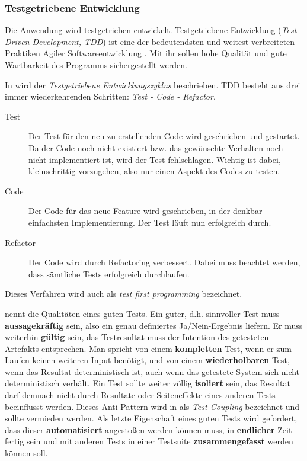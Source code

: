 \subsubsection{Testgetriebene Entwicklung}
\label{subsec:tdd}

Die Anwendung wird testgetrieben entwickelt. Testgetriebene Entwicklung (\textit{Test Driven Development, TDD}) ist eine der bedeutendsten und weitest verbreiteten Praktiken Agiler Softwareentwicklung . Mit ihr sollen hohe Qualität und gute Wartbarkeit des Programms sichergestellt werden.

In  wird der \textit{Testgetriebene Entwicklungszyklus} beschrieben. TDD besteht aus drei immer wiederkehrenden Schritten: \textit{Test - Code - Refactor}.

\begin{description}
  \item[Test] Der Test für den neu zu erstellenden Code wird geschrieben und gestartet. Da der Code noch nicht existiert bzw. das gewünschte Verhalten noch nicht implementiert ist, wird der Test fehlschlagen. Wichtig ist dabei, kleinschrittig vorzugehen, also nur einen Aspekt des Codes zu testen.
  \item[Code] Der Code für das neue Feature wird geschrieben, in der denkbar einfachsten Implementierung. Der Test läuft nun erfolgreich durch.
  \item[Refactor] Der Code wird durch Refactoring verbessert. Dabei muss beachtet werden, dass sämtliche Tests erfolgreich durchlaufen.
\end{description}

Dieses Verfahren wird auch als \textit{test first programming} bezeichnet. 

 nennt die Qualitäten eines guten Tests. Ein guter, d.h. sinnvoller Test muss \textbf{aussagekräftig} sein, also ein genau definiertes Ja/Nein-Ergebnis liefern. Er muss weiterhin \textbf{gültig} sein, das Testresultat muss der Intention des getesteten Artefakts entsprechen. Man spricht von einem \textbf{kompletten} Test, wenn er zum Laufen keinen weiteren Input benötigt, und von einem \textbf{wiederholbaren} Test, wenn das Resultat deterministisch ist, auch wenn das getestete System sich nicht deterministisch verhält. Ein Test sollte weiter völlig \textbf{isoliert} sein, das Resultat darf demnach nicht durch Resultate oder Seiteneffekte eines anderen Tests beeinflusst werden. Dieses Anti-Pattern wird in  als \textit{Test-Coupling} bezeichnet und sollte vermieden werden. Als letzte Eigenschaft eines guten Tests wird gefordert, dass dieser \textbf{automatisiert} angestoßen werden können muss, in \textbf{endlicher} Zeit fertig sein und mit anderen Tests in einer Testsuite \textbf{zusammengefasst} werden können soll.


